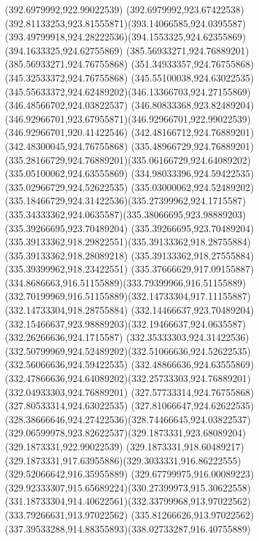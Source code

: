 {{{{				\lineto(392.6979992,922.99022539)
				\curveto(392.6979992,923.67422538)(392.81133253,923.81555871)(393.14066585,924.0395587)
				\curveto(393.49799918,924.28222536)(394.1553325,924.62355869)(394.1633325,924.62755869)
				\closepath
				\moveto(385.56933271,924.76889201)
				\lineto(385.56933271,924.76755868)
				\closepath
				\moveto(351.34933357,924.76755868)
				\lineto(345.32533372,924.76755868)
				\lineto(345.55100038,924.63022535)
				\curveto(345.55633372,924.62489202)(346.13366703,924.27155869)(346.48566702,924.03822537)
				\curveto(346.80833368,923.82489204)(346.92966701,923.67955871)(346.92966701,922.99022539)
				\lineto(346.92966701,920.41422546)
				\lineto(342.48166712,924.76889201)
				\lineto(342.48300045,924.76755868)
				\lineto(335.48966729,924.76889201)
				\curveto(335.28166729,924.76889201)(335.06166729,924.64089202)(335.05100062,924.63555869)
				\lineto(334.98033396,924.59422535)
				\lineto(335.02966729,924.52622535)
				\curveto(335.03000062,924.52489202)(335.18466729,924.31422536)(335.27399962,924.1715587)
				\curveto(335.34333362,924.0635587)(335.38066695,923.98889203)(335.39266695,923.70489204)
				\curveto(335.39266695,923.70489204)(335.39133362,918.29822551)(335.39133362,918.28755884)
				\lineto(335.39133362,918.28089218)
				\lineto(335.39133362,918.27555884)
				\lineto(335.39399962,918.23422551)
				\curveto(335.37666629,917.09155887)(334.8686663,916.51155889)(333.79399966,916.51155889)
				\curveto(332.70199969,916.51155889)(332.14733304,917.11155887)(332.14733304,918.28755884)
				\lineto(332.14466637,923.70489204)
				\curveto(332.15466637,923.98889203)(332.19466637,924.0635587)(332.26266636,924.1715587)
				\curveto(332.35333303,924.31422536)(332.50799969,924.52489202)(332.51066636,924.52622535)
				\lineto(332.56066636,924.59422535)
				\lineto(332.48866636,924.63555869)
				\curveto(332.47866636,924.64089202)(332.25733303,924.76889201)(332.04933303,924.76889201)
				\lineto(327.57733314,924.76755868)
				\lineto(327.80533314,924.63022535)
				\curveto(327.81066647,924.62622535)(328.38666646,924.27422536)(328.74466645,924.03822537)
				\curveto(329.06599978,923.82622537)(329.1873331,923.68089204)(329.1873331,922.99022539)
				\lineto(329.1873331,918.60489217)
				\curveto(329.1873331,917.63955886)(329.3033331,916.86222555)(329.52066642,916.35955889)
				\curveto(329.67799975,916.00089223)(329.92333307,915.65689224)(330.27399973,915.30622558)
				\curveto(331.18733304,914.40622561)(332.33799968,913.97022562)(333.79266631,913.97022562)
				\curveto(335.81266626,913.97022562)(337.39533288,914.88355893)(338.02733287,916.40755889)
}}}}
